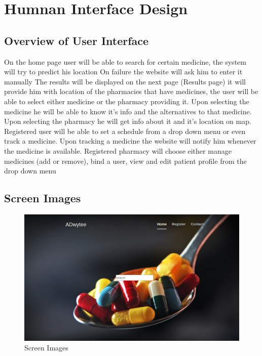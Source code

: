 \documentclass[]{article}
\begin{document}
\section{Humnan Interface Design}

\subsection {Overview of User Interface}
On the home page user will be able to search for certain medicine, the system will try to predict his location
\newline
On failure the website will ask him to enter it manually
\newline
The results will be displayed on the next page (Results page) it will provide him with location of the pharmacies that have medicines, the user will be able to select either medicine or the pharmacy providing it.
\newline
Upon selecting the medicine he will be able to know it's info and the alternatives to that medicine.
\newline
Upon selecting the pharmacy he will get info about it and it's location on map.
\newline
\newline
Registered user will be able to set a schedule from a drop down menu or even track a medicine.
\newline
Upon tracking a medicine the website will notify him whenever the medicine is available.
\newline
\newline
Registered pharmacy will choose either manage medicines (add or remove), bind a user, view and edit patient profile from the drop down menu
\newline

\subsection {Screen Images}

\begin{figure}[tbh]
\centering
\includegraphics[width=0.5\linewidth]{./Home}
\caption{Screen Images}
\label{fig:image}
\end{figure}
\end{document}
